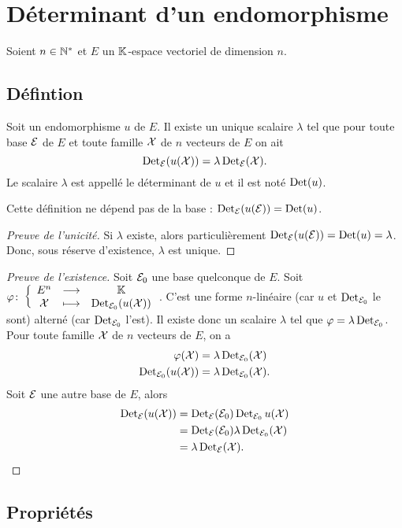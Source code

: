 \section{Déterminant d'un endomorphisme}

Soient $n \in \mathbb{N}^*$ et $E$ un $\mathbb{K}$-espace vectoriel de dimension $n$.

\subsection{Défintion}

\begin{theo}
  Soit un endomorphisme $u$ de $E$. Il existe un unique scalaire $\lambda$ tel que pour toute base $\mathcal{E}$ de $E$ et toute famille $\mathcal{X}$ de $n$ vecteurs de $E$ on ait
  \begin{equation}
    \operatorname{Det}_{\mathcal{E}}(u(\mathcal{X})) = \lambda \operatorname{Det}_{\mathcal{E}}(\mathcal{X}).
  \end{equation}
  Le scalaire $\lambda$ est appellé le déterminant de $u$ et il est noté $\operatorname{Det}(u)$.
\end{theo}
Cette définition ne dépend pas de la base : $\operatorname{Det}_{\mathcal{E}}(u(\mathcal{E})) = \operatorname{Det}(u)$.
\begin{proof}[Preuve de l'unicité]
  Si $\lambda$ existe, alors particulièrement $\operatorname{Det}_{\mathcal{E}}(u(\mathcal{E})) = \operatorname{Det}(u) = \lambda$. Donc, sous réserve d'existence, $\lambda$ est unique.
\end{proof}
\begin{proof}[Preuve de l'existence]
  Soit $\mathcal{E}_0$ une base quelconque de $E$. Soit $\varphi\colon \left\{\begin{array}{ccc} E^n & \longrightarrow &\mathbb{K}\\ \mathcal{X} & \longmapsto & \operatorname{Det}_{\mathcal{E}_{0}}(u(\mathcal{X})) \end{array} \right.$. C'est une forme $n$-linéaire (car $u$ et $\operatorname{Det}_{\mathcal{E}_{0}}$ le sont) alterné (car $\operatorname{Det}_{\mathcal{E}_{0}}$ l'est). Il existe donc un scalaire $\lambda$ tel que $\varphi = \lambda \operatorname{Det}_{\mathcal{E}_0}$. Pour toute famille $\mathcal{X}$ de $n$ vecteurs de $E$, on a
  \begin{align}
    \varphi(\mathcal{X}) &= \lambda \operatorname{Det}_{\mathcal{E}_0}(\mathcal{X}) \\
    \operatorname{Det}_{\mathcal{E}_{0}}(u(\mathcal{X})) &= \lambda \operatorname{Det}_{\mathcal{E}_0}(\mathcal{X}).
  \end{align}
  Soit $\mathcal{E}$ une autre base de $E$, alors
  \begin{align}
    \operatorname{Det}_{\mathcal{E}}(u(\mathcal{X})) &= \operatorname{Det}_{\mathcal{E}}(\mathcal{E}_0) \operatorname{Det}_{\mathcal{E}_0} u(\mathcal{X}) \\
    &= \operatorname{Det}_{\mathcal{E}}(\mathcal{E}_0) \lambda \operatorname{Det}_{\mathcal{E}_0}(\mathcal{X}) \\
    &= \lambda \operatorname{Det}_{\mathcal{E}}(\mathcal{X}).
  \end{align}
\end{proof}

\subsection{Propriétés}

